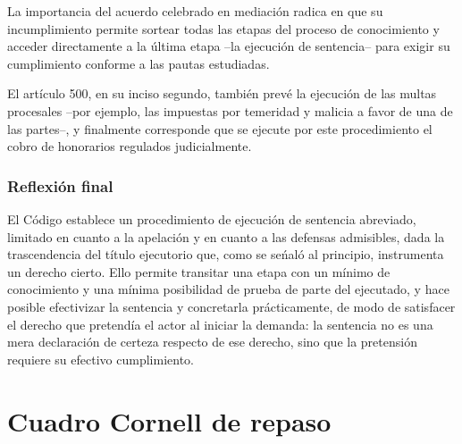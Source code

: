 \documentclass[12pt,oneside]{book}
\begin{document}
La importancia del acuerdo celebrado en mediaci\'on radica en que su incumplimiento permite sortear todas las etapas del proceso de conocimiento y acceder directamente a la \'ultima etapa --la ejecuci\'on de sentencia-- para exigir su cumplimiento conforme a las pautas estudiadas.

El art\'iculo 500, en su inciso segundo, tambi\'en prev\'e la ejecuci\'on de las multas procesales --por ejemplo, las impuestas por temeridad y malicia a favor de una de las partes--, y finalmente corresponde que se ejecute por este procedimiento el cobro de honorarios regulados judicialmente.

\subsection*{Reflexi\'on final}

El C\'odigo establece un procedimiento de ejecuci\'on de sentencia abreviado, limitado en cuanto a la apelaci\'on y en cuanto a las defensas admisibles, dada la trascendencia del t\'itulo ejecutorio que, como se se\'nal\'o al principio, instrumenta un derecho cierto. Ello permite transitar una etapa con un m\'inimo de conocimiento y una m\'inima posibilidad de prueba de parte del ejecutado, y hace posible efectivizar la sentencia y concretarla pr\'acticamente, de modo de satisfacer el derecho que pretend\'ia el actor al iniciar la demanda: la sentencia no es una mera declaraci\'on de certeza respecto de ese derecho, sino que la pretensi\'on requiere su efectivo cumplimiento.


\chapter*{Cuadro Cornell de repaso}
\end{document}

